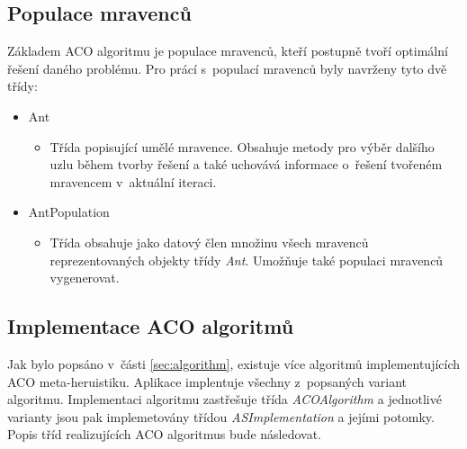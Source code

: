 \documentclass[a4paper, 12pt]{article}
\begin{document}
\subsection{Populace mravenců}
Základem ACO algoritmu je populace mravenců, kteří postupně tvoří optimální řešení daného problému. Pro prácí s~populací mravenců byly navrženy tyto dvě třídy:
\begin{itemize}
  \item Ant
  \begin{itemize}
    \item[] Třída popisující umělé mravence. Obsahuje metody pro výběr dalšího uzlu během tvorby řešení a také uchovává informace o~řešení tvořeném mravencem
    v~aktuální iteraci.
  \end{itemize}
  \item AntPopulation
  \begin{itemize}
    \item[] Třída obsahuje jako datový člen množinu všech mravenců reprezentovaných objekty třídy \emph{Ant}. Umožňuje také populaci mravenců vygenerovat.
  \end{itemize}
\end{itemize}

\subsection{Implementace ACO algoritmů}
Jak bylo popsáno v~části \ref{sec:algorithm}, existuje více algoritmů implementujících ACO meta-heruistiku.
Aplikace implentuje všechny z~popsaných variant algoritmu. Implementaci algoritmu zastřešuje třída \emph{ACOAlgorithm} a jednotlivé varianty jsou pak
implemetovány třídou \emph{ASImplementation} a jejími potomky. Popis tříd realizujících ACO algoritmus bude následovat.
\end{document}
